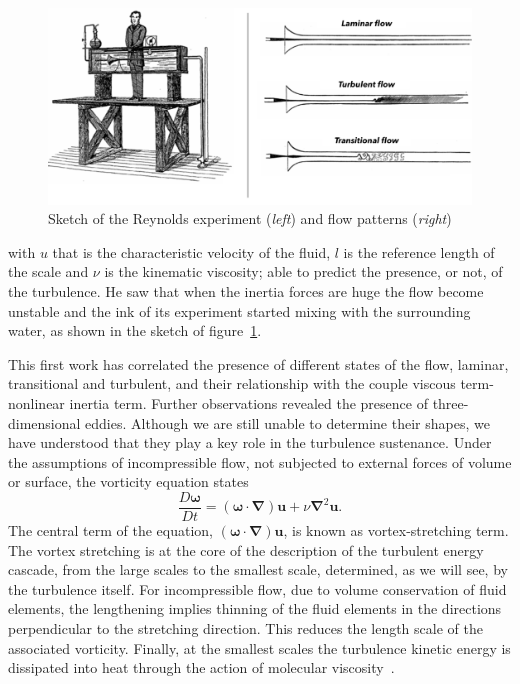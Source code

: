 \begin{figure}
\begin{center}
\includegraphics[width=1\textwidth]{grafici/reynolds_exp}
\caption{Sketch of the Reynolds experiment (\emph{left}) and flow patterns (\emph{right})}
\label{Reynolds:exp}
\end{center}
\end{figure}

with $u$ that is the characteristic velocity of the fluid, $l$ is the reference length of the scale and $\nu$ is the kinematic viscosity; able to predict the presence, or not, of the turbulence. He saw that when the inertia forces are huge the flow become unstable and the ink of its experiment started mixing with the surrounding water, as shown in the sketch of figure~\ref{Reynolds:exp}.
\par
This first work has correlated the presence of different states of the flow, laminar, transitional and turbulent, and their relationship with the couple viscous term-nonlinear inertia term.
Further observations revealed the presence of three-dimensional eddies. Although we are still unable to determine their shapes, we have understood that they play a key role in the turbulence sustenance. Under the assumptions of incompressible flow, not subjected to external forces of volume or surface, the vorticity equation states
\begin{equation}
\frac{D \boldsymbol{\omega}}{D t} = (\boldsymbol{\omega} \cdot \boldsymbol{\nabla})\boldsymbol{u} + \nu \boldsymbol{\nabla}^{2} \boldsymbol{u}.
\end{equation}
The central term of the equation, $ (\boldsymbol{\omega} \cdot \boldsymbol{\nabla})\boldsymbol{u}$, is known as vortex-stretching term. 
The vortex stretching is at the core of the description of the turbulent energy cascade, from the large scales to the smallest scale, determined, as we will see, by the turbulence itself.
For incompressible flow, due to volume conservation of fluid elements, the lengthening implies thinning of the fluid elements in the directions perpendicular to the stretching direction. This reduces the length scale of the associated vorticity. Finally, at the smallest scales the turbulence kinetic energy is dissipated into heat through the action of molecular viscosity~\cite{Lumley}.



